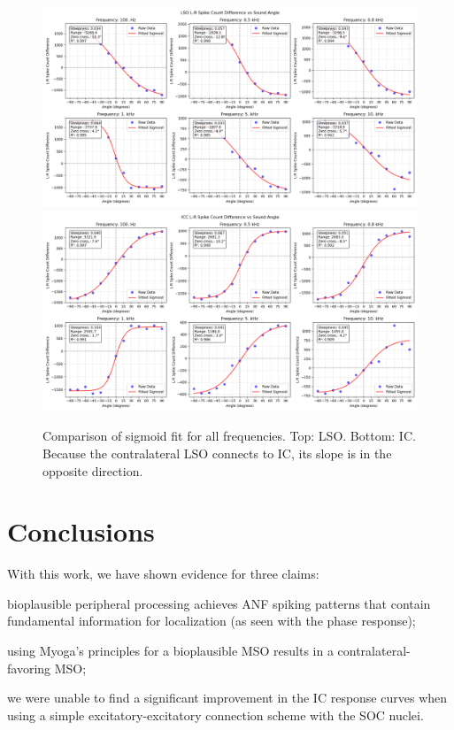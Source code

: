 \documentclass[11pt,a4paper,twocolumn]{article}
\begin{document}
\begin{figure}
    \centering
    \includegraphics[width=0.7\linewidth]{Images/LSOfit.png}
    \includegraphics[width=0.7\linewidth]{Images/ICCfit.png}
    \caption{Comparison of sigmoid fit for all frequencies. Top: LSO. Bottom: IC. Because the contralateral LSO connects to IC, its slope is in the opposite direction.}
    \label{fig:lso-icc-fit-sigmoid}
\end{figure}


\section{Conclusions}
With this work, we have shown evidence for three claims: 
\begin{inlinelist}
    \item bioplausible peripheral processing achieves ANF spiking patterns that contain fundamental information for localization (as seen with the phase response);
    \item using Myoga's principles for a bioplausible MSO results in a contralateral-favoring MSO;
    \item we were unable to find a significant improvement in the IC response curves when using a simple excitatory-excitatory connection scheme with the SOC nuclei.
\end{inlinelist}


\end{document}
